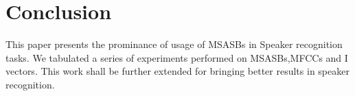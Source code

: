 \documentclass{acm_proc_article-sp}
\begin{document}
\section{Conclusion}

This paper presents the prominance of usage of MSASBs in Speaker recognition tasks. We tabulated a series of experiments performed on MSASBs,MFCCs and I vectors. This work shall be further extended for bringing better results in speaker recognition.




 




%
%












\balancecolumns
\end{document}
